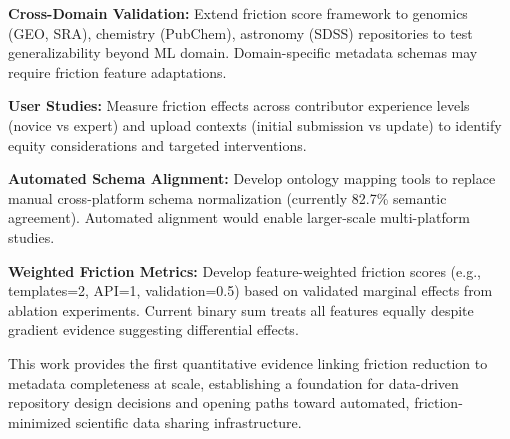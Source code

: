 \textbf{Cross-Domain Validation:} Extend friction score framework to genomics (GEO, SRA), chemistry (PubChem), astronomy (SDSS) repositories to test generalizability beyond ML domain. Domain-specific metadata schemas may require friction feature adaptations.

\textbf{User Studies:} Measure friction effects across contributor experience levels (novice vs expert) and upload contexts (initial submission vs update) to identify equity considerations and targeted interventions.

\textbf{Automated Schema Alignment:} Develop ontology mapping tools to replace manual cross-platform schema normalization (currently 82.7\% semantic agreement). Automated alignment would enable larger-scale multi-platform studies.

\textbf{Weighted Friction Metrics:} Develop feature-weighted friction scores (e.g., templates=2, API=1, validation=0.5) based on validated marginal effects from ablation experiments. Current binary sum treats all features equally despite gradient evidence suggesting differential effects.

This work provides the first quantitative evidence linking friction reduction to metadata completeness at scale, establishing a foundation for data-driven repository design decisions and opening paths toward automated, friction-minimized scientific data sharing infrastructure.
